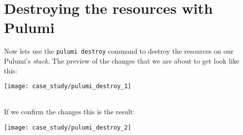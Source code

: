 \section{Destroying the resources with Pulumi}
Now lets use the \texttt{pulumi destroy} command to destroy the resources on our Pulumi's \textit{stack}.
The preview of the changes that we are about to get look like this:
\begin{center}
  \texttt{[image: case\_study/pulumi\_destroy\_1]} 
\end{center}\mbox{}\\

If we confirm the changes this is the result:
\begin{center}
  \texttt{[image: case\_study/pulumi\_destroy\_2]} 
\end{center}\mbox{}\\


